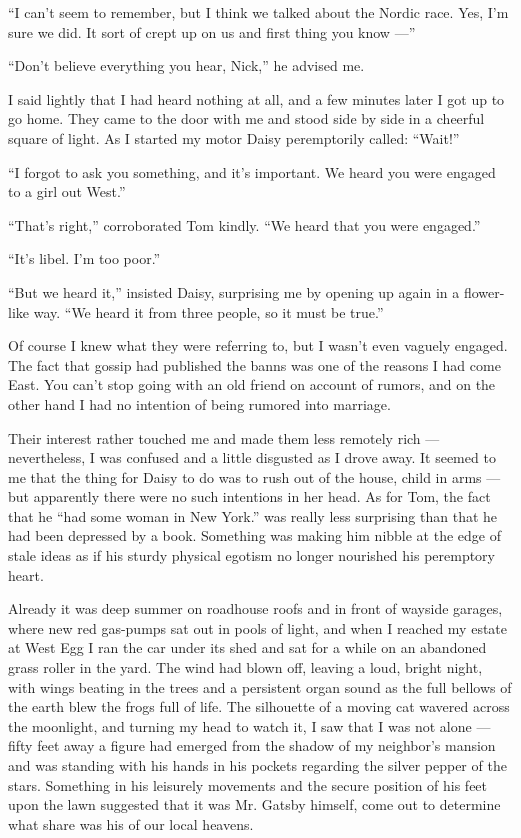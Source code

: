 \documentclass{znotebook}
\begin{document}
``I can't seem to remember, but I think we talked about the Nordic race. Yes, I'm sure we did. It sort of crept up on us and first thing you know ---''

``Don't believe everything you hear, Nick,'' he advised me.

I said lightly that I had heard nothing at all, and a few minutes later I got up to go home. They came to the door with me and stood side by side in a cheerful square of light. As I started my motor Daisy peremptorily called: ``Wait!''

``I forgot to ask you something, and it's important. We heard you were engaged to a girl out West.''

``That's right,'' corroborated Tom kindly. ``We heard that you were engaged.''

``It's libel. I'm too poor.''

``But we heard it,'' insisted Daisy, surprising me by opening up again in a flower-like way. ``We heard it from three people, so it must be true.''

Of course I knew what they were referring to, but I wasn't even vaguely engaged. The fact that gossip had published the banns was one of the reasons I had come East. You can't stop going with an old friend on account of rumors, and on the other hand I had no intention of being rumored into marriage.

Their interest rather touched me and made them less remotely rich ---{} nevertheless, I was confused and a little disgusted as I drove away. It seemed to me that the thing for Daisy to do was to rush out of the house, child in arms ---{} but apparently there were no such intentions in her head. As for Tom, the fact that he ``had some woman in New York.'' was really less surprising than that he had been depressed by a book. Something was making him nibble at the edge of stale ideas as if his sturdy physical egotism no longer nourished his peremptory heart.

Already it was deep summer on roadhouse roofs and in front of wayside garages, where new red gas-pumps sat out in pools of light, and when I reached my estate at West Egg I ran the car under its shed and sat for a while on an abandoned grass roller in the yard. The wind had blown off, leaving a loud, bright night, with wings beating in the trees and a persistent organ sound as the full bellows of the earth blew the frogs full of life. The silhouette of a moving cat wavered across the moonlight, and turning my head to watch it, I saw that I was not alone ---{} fifty feet away a figure had emerged from the shadow of my neighbor's mansion and was standing with his hands in his pockets regarding the silver pepper of the stars. Something in his leisurely movements and the secure position of his feet upon the lawn suggested that it was Mr. Gatsby himself, come out to determine what share was his of our local heavens.
\end{document}
